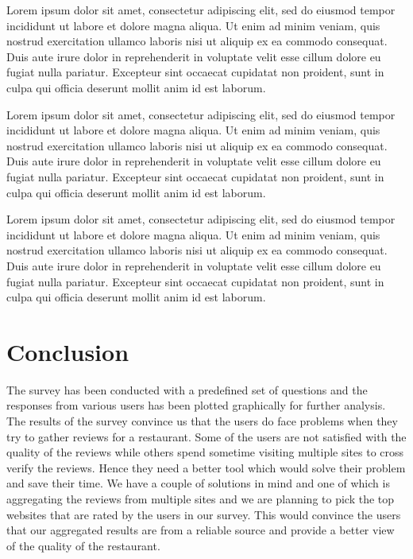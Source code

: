 \documentclass{acm_proc_article-sp}
\begin{document}
Lorem ipsum dolor sit amet, consectetur adipiscing elit, sed do eiusmod tempor incididunt ut labore et dolore magna aliqua. Ut enim ad minim veniam, quis nostrud exercitation ullamco laboris nisi ut aliquip ex ea commodo consequat. Duis aute irure dolor in reprehenderit in voluptate velit esse cillum dolore eu fugiat nulla pariatur. Excepteur sint occaecat cupidatat non proident, sunt in culpa qui officia deserunt mollit anim id est laborum.

Lorem ipsum dolor sit amet, consectetur adipiscing elit, sed do eiusmod tempor incididunt ut labore et dolore magna aliqua. Ut enim ad minim veniam, quis nostrud exercitation ullamco laboris nisi ut aliquip ex ea commodo consequat. Duis aute irure dolor in reprehenderit in voluptate velit esse cillum dolore eu fugiat nulla pariatur. Excepteur sint occaecat cupidatat non proident, sunt in culpa qui officia deserunt mollit anim id est laborum.

Lorem ipsum dolor sit amet, consectetur adipiscing elit, sed do eiusmod tempor incididunt ut labore et dolore magna aliqua. Ut enim ad minim veniam, quis nostrud exercitation ullamco laboris nisi ut aliquip ex ea commodo consequat. Duis aute irure dolor in reprehenderit in voluptate velit esse cillum dolore eu fugiat nulla pariatur. Excepteur sint occaecat cupidatat non proident, sunt in culpa qui officia deserunt mollit anim id est laborum.

\section{Conclusion}
The survey has been conducted with a predefined set of questions and the responses from various users has been plotted graphically for further analysis. The results of the survey convince us that the users do face problems when they try to gather reviews for a restaurant. Some of the users are not satisfied with the quality of the reviews while others spend sometime visiting multiple sites to cross verify the reviews. Hence they need a better tool which would solve their problem and save their time. We have a couple of solutions in mind and one of which is aggregating the reviews from multiple sites and we are planning to pick the top websites that are rated by the users in our survey. This would convince the users that our aggregated results are from a reliable source and provide a better view of the quality of the restaurant. 





\end{document}
